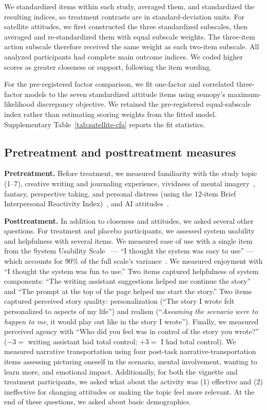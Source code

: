 \documentclass[11pt]{article}
\begin{document}
We standardized items within each study, averaged them, and standardized the resulting indices, so treatment contrasts are in standard-deviation units. For satellite attitudes, we first constructed the three standardized subscales, then averaged and re-standardized them with equal subscale weights. The three-item action subscale therefore received the same weight as each two-item subscale. All analyzed participants had complete main outcome indices. We coded higher scores as greater closeness or support, following the item wording.

For the pre-registered factor comparison, we fit one-factor and correlated three-factor models to the seven standardized attitude items using semopy's maximum-likelihood discrepancy objective. We retained the pre-registered equal-subscale index rather than estimating scoring weights from the fitted model. Supplementary Table~\ref{tab:satellite-cfa} reports the fit statistics.

\subsection{Pretreatment and posttreatment measures}
\label{sec:methods-pretreatment-and-experience-measures}

\textbf{Pretreatment.} Before treatment, we measured familiarity with the study topic (1--7), creative writing and journaling experience, vividness of mental imagery~\citep[5 items;][]{andrade_assessing_2014}, fantasy, perspective taking, and personal distress (using the 12-item Brief Interpersonal Reactivity Index)~\citep{ingoglia_development_2016}, and AI attitudes~\citep[AIAS-4;][]{grassini_development_2023}.

\textbf{Posttreatment.} In addition to closeness and attitudes, we asked several other questions. For treatment and placebo participants, we assessed system usability and helpfulness with several items. We measured ease of use with a single item from the System Usability Scale~\citep{lewis_system_2018} --- ``I thought the system was easy to use'' --- which accounts for 90\% of the full scale's variance~\citep{sauro_can_2018}. We measured enjoyment with ``I thought the system was fun to use.'' Two items captured helpfulness of system components: ``The writing assistant suggestions helped me continue the story'' and ``The prompt at the top of the page helped me start the story.'' Two items captured perceived story quality: personalization (``The story I wrote felt personalized to aspects of my life'') and realism (``\textit{Assuming the scenario were to happen to me}, it would play out like in the story I wrote''). Finally, we measured perceived agency with ``Who did you feel was in control of the story you wrote?'' ($-3 =$ writing assistant had total control; $+3 =$ I had total control). We measured narrative transportation using four post-task narrative-transportation items assessing picturing oneself in the scenario, mental involvement, wanting to learn more, and emotional impact. Additionally, for both the vignette and treatment participants, we asked what about the activity was (1) effective and (2) ineffective for changing attitudes or making the topic feel more relevant. At the end of these questions, we asked about basic demographics.
\end{document}
